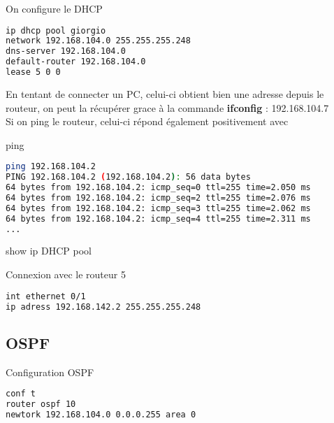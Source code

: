 \documentclass[10pt,a4paper]{article}
\begin{document}
\noindent On configure le DHCP
\begin{lstlisting}[language=bash]
ip dhcp pool giorgio
network 192.168.104.0 255.255.255.248
dns-server 192.168.104.0
default-router 192.168.104.0
lease 5 0 0
\end{lstlisting}

En tentant de connecter un PC, celui-ci obtient bien une adresse depuis le routeur, on peut la récupérer grace à la commande \textbf{ifconfig} : 192.168.104.7 \\
Si on ping le routeur, celui-ci répond également positivement avec 

\noindent ping
\begin{lstlisting}[language=bash]
ping 192.168.104.2
PING 192.168.104.2 (192.168.104.2): 56 data bytes
64 bytes from 192.168.104.2: icmp_seq=0 ttl=255 time=2.050 ms
64 bytes from 192.168.104.2: icmp_seq=2 ttl=255 time=2.076 ms
64 bytes from 192.168.104.2: icmp_seq=3 ttl=255 time=2.062 ms
64 bytes from 192.168.104.2: icmp_seq=4 ttl=255 time=2.311 ms
...
\end{lstlisting}
show ip DHCP pool

\noindent Connexion avec le routeur 5
\begin{lstlisting}[language=bash]
int ethernet 0/1
ip adress 192.168.142.2 255.255.255.248
\end{lstlisting}

\subsection{OSPF}

\noindent Configuration OSPF
\begin{lstlisting}[language=bash]
conf t
router ospf 10
newtork 192.168.104.0 0.0.0.255 area 0
\end{lstlisting}
\end{document}
